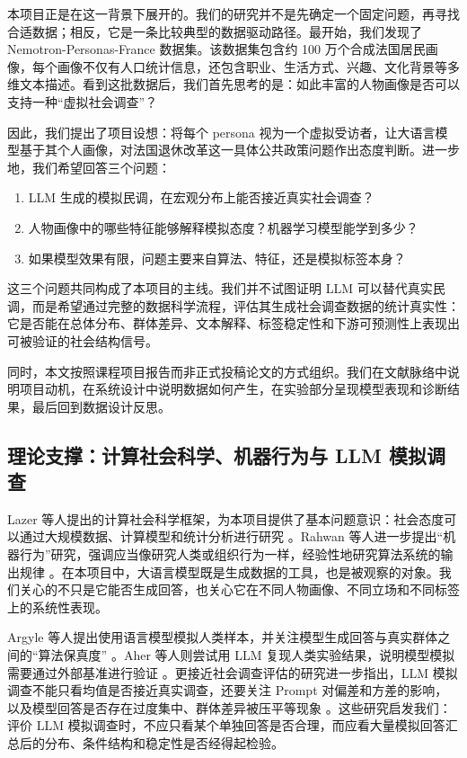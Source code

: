 \documentclass[11pt,a4paper]{ctexart}
\newcommand{\dataset}{Nemotron-Personas-France}
\begin{document}
本项目正是在这一背景下展开的。我们的研究并不是先确定一个固定问题，再寻找合适数据；相反，它是一条比较典型的数据驱动路径。最开始，我们发现了 \dataset{} 数据集。该数据集包含约 100 万个合成法国居民画像，每个画像不仅有人口统计信息，还包含职业、生活方式、兴趣、文化背景等多维文本描述。看到这批数据后，我们首先思考的是：如此丰富的人物画像是否可以支持一种“虚拟社会调查”？

因此，我们提出了项目设想：将每个 persona 视为一个虚拟受访者，让大语言模型基于其个人画像，对法国退休改革这一具体公共政策问题作出态度判断。进一步地，我们希望回答三个问题：

\begin{enumerate}
  \item LLM 生成的模拟民调，在宏观分布上能否接近真实社会调查？
  \item 人物画像中的哪些特征能够解释模拟态度？机器学习模型能学到多少？
  \item 如果模型效果有限，问题主要来自算法、特征，还是模拟标签本身？
\end{enumerate}

这三个问题共同构成了本项目的主线。我们并不试图证明 LLM 可以替代真实民调，而是希望通过完整的数据科学流程，评估其生成社会调查数据的统计真实性：它是否能在总体分布、群体差异、文本解释、标签稳定性和下游可预测性上表现出可被验证的社会结构信号。

同时，本文按照课程项目报告而非正式投稿论文的方式组织。我们在文献脉络中说明项目动机，在系统设计中说明数据如何产生，在实验部分呈现模型表现和诊断结果，最后回到数据设计反思。

\subsection{理论支撑：计算社会科学、机器行为与 LLM 模拟调查}
 Lazer 等人提出的计算社会科学框架，为本项目提供了基本问题意识：社会态度可以通过大规模数据、计算模型和统计分析进行研究 \cite{lazer2009computational}。Rahwan 等人进一步提出“机器行为”研究，强调应当像研究人类或组织行为一样，经验性地研究算法系统的输出规律 \cite{rahwan2019machine}。在本项目中，大语言模型既是生成数据的工具，也是被观察的对象。我们关心的不只是它能否生成回答，也关心它在不同人物画像、不同立场和不同标签上的系统性表现。

Argyle 等人提出使用语言模型模拟人类样本，并关注模型生成回答与真实群体之间的“算法保真度” \cite{argyle2023out}。Aher 等人则尝试用 LLM 复现人类实验结果，说明模型模拟需要通过外部基准进行验证 \cite{aher2023using}。更接近社会调查评估的研究进一步指出，LLM 模拟调查不能只看均值是否接近真实调查，还要关注 Prompt 对偏差和方差的影响，以及模型回答是否存在过度集中、群体差异被压平等现象 \cite{geng2024chameleons}。这些研究启发我们：评价 LLM 模拟调查时，不应只看某个单独回答是否合理，而应看大量模拟回答汇总后的分布、条件结构和稳定性是否经得起检验。
\end{document}
